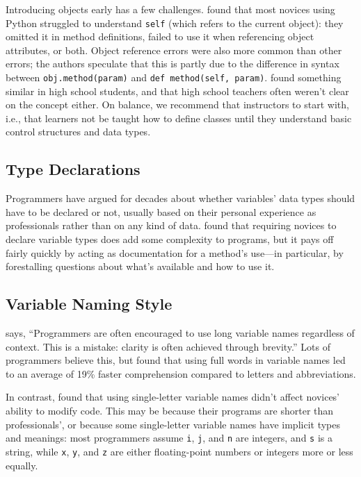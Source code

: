Introducing objects early has a few challenges.
\cite{Mill2016b} found that most novices using Python struggled to understand \texttt{self}
(which refers to the current object):
they omitted it in method definitions,
failed to use it when referencing object attributes,
or both.
Object reference errors were also more common than other errors;
the authors speculate that this is partly due to the difference in syntax
between \texttt{obj.method(param)} and \texttt{def\ method(self,\ param)}.
\cite{Rago2017} found something similar in high school students,
and that high school teachers often weren't clear on the concept either.
On balance,
we recommend that instructors  to start with,
i.e.,
that learners not be taught how to define classes until they understand basic control structures and data types.

\subsection*{Type Declarations}

Programmers have argued for decades about whether variables' data types should have to be declared or not,
usually based on their personal experience as professionals
rather than on any kind of data.
\cite{Endr2014,Fisc2015} found that requiring novices to declare variable types does add some complexity to programs,
but it pays off fairly quickly by acting as documentation for a method's use---in particular,
by forestalling questions about what's available and how to use it.

\subsection*{Variable Naming Style}

\cite{Kern1999} says, ``Programmers are often encouraged to use long variable names regardless of context. This is a mistake: clarity is often achieved through brevity.'' Lots of programmers believe this, but \cite{Hofm2017} found that using full words in variable names led to an average of 19\% faster comprehension compared to letters and abbreviations.

In contrast, \cite{Beni2017} found that using single-letter variable names didn't affect novices' ability to modify code. This may be because their programs are shorter than professionals', or because some single-letter variable names have implicit types and meanings: most programmers assume \texttt{i}, \texttt{j}, and \texttt{n} are integers, and \texttt{s} is a string, while \texttt{x}, \texttt{y}, and \texttt{z} are either floating-point numbers or integers more or less equally.

